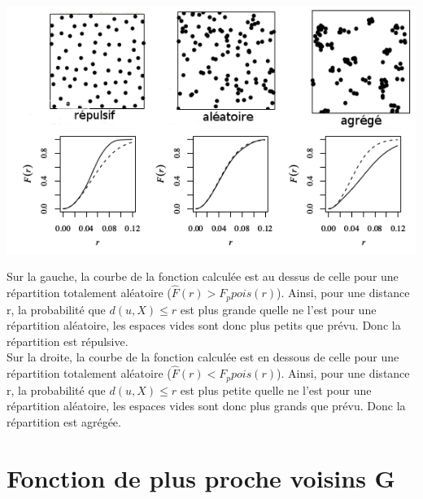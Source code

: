 \documentclass[french,12pt,a4paper]{report}
\begin{document}
\includegraphics[scale=0.7]{images/interpret.png}

Sur la gauche, la courbe de la fonction calculée est au dessus de celle pour une répartition totalement aléatoire (\begin{math}\hat{F}(r) > F_p{pois}(r) \end{math}). Ainsi, pour une distance r, la probabilité que \begin{math} d(u,X) \leq r \end{math} est plus grande quelle ne l'est pour une répartition aléatoire, les espaces vides sont donc plus petits que prévu. Donc la répartition est répulsive.\\
\indent
Sur la droite, la courbe de la fonction calculée est en dessous de celle pour une répartition totalement aléatoire (\begin{math}\hat{F}(r) < F_p{pois}(r) \end{math}). Ainsi, pour une distance r, la probabilité que \begin{math} d(u,X) \leq r \end{math} est plus petite quelle ne l'est pour une répartition aléatoire, les espaces vides sont donc plus grands que prévu. Donc la répartition est agrégée.




\section{Fonction de plus proche voisins G}
\end{document}
